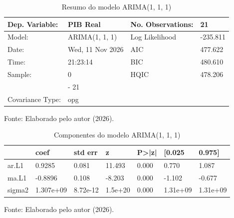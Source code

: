 \begin{table}[htbp]
	\centering
	\captionsetup{justification=centering}
	\caption{Resumo do modelo ARIMA(1, 1, 1)}
	\label{tab:configuracoes_arima}
	\begin{tabular}{llll}
		\toprule
		Dep. Variable: & PIB Real &   No. Observations:   & 21 \\
		\midrule
		Model: & ARIMA(1, 1, 1) &   Log Likelihood      & -235.811 \\
		Date: & Wed, 11 Nov 2026 &   AIC                 & 477.622 \\
		Time: & 21:23:14 &   BIC                 & 480.610 \\
		Sample: & 0 &   HQIC                & 478.206 \\
		&  - 21 &                       &   \\
		Covariance Type: & opg &                       &   \\
		\bottomrule
	\end{tabular}
	
	\vspace{0.1cm}
	
	\centering
	\small Fonte: Elaborado pelo autor (2026).
\end{table}

\begin{table}[htbp]
	\centering
	\captionsetup{justification=centering}
	\caption{Componentes do modelo ARIMA(1, 1, 1)}
	\label{tab:componentes_ar_ma}
	\begin{tabular}{lllllll}
		\toprule
		& coef & std err & z & P>|z| & [0.025 & 0.975] \\
		\midrule
		ar.L1 &     0.9285 &     0.081 &    11.493 &  0.000 &     0.770 &     1.087 \\
		ma.L1 &    -0.8896 &     0.108 &    -8.203 &  0.000 &    -1.102 &    -0.677 \\
		sigma2 &  1.307e+09 &  8.72e-12 &   1.5e+20 &  0.000 &  1.31e+09 &  1.31e+09 \\
		\bottomrule
	\end{tabular}
	
	\vspace{0.1cm}
	
	\centering
	\small Fonte: Elaborado pelo autor (2026).
\end{table}

